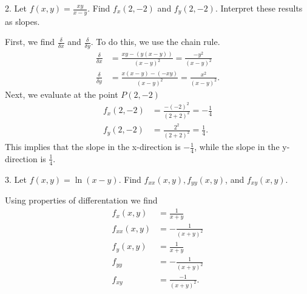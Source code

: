 \documentclass{report}
\begin{document}
    \begin{mdframed}
        2. Let $f(x, y)=\frac{x y}{x-y}$. Find $f_x(2,-2)$ and $f_y(2,-2)$. Interpret these results as slopes.
    \end{mdframed}
    \bigbreak \noindent 
    First, we find $\frac{\delta }{\delta x}$ and $\frac{\delta }{\delta y}$. To do this, we use the chain rule.
    \begin{align*}
        \frac{\delta }{\delta x} &=  \frac{xy - (y(x-y))}{(x-y)^{2}} = \frac{-y^{2}}{(x-y)^{2}} \\
        \frac{\delta }{\delta y}&= \frac{x(x-y)-(-xy)}{(x-y)^{2}} = \frac{x^{2}}{(x-y)^{2}}
    .\end{align*}
    \bigbreak \noindent 
    Next, we evaluate at the point $P(2,-2)$
    \begin{align*}
        f_{x}(2,-2) &= \frac{-(-2)^{2}}{(2+2)^{2}} = -\frac{1}{4} \\
        f_{y}(2,-2)&=  \frac{2^{2}}{(2+2)^{2}} = \frac{1}{4}
    .\end{align*}
    \bigbreak \noindent 
    This implies that the slope in the x-direction is $-\frac{1}{4}$, while the slope in the y-direction is $\frac{1}{4}$. 

    \bigbreak \noindent 
    \begin{mdframed}
        3. Let $f(x, y)=\ln (x-y)$. Find $f_{x x}(x, y), f_{y y}(x, y)$, and $f_{x y}(x, y)$.
    \end{mdframed}
    \bigbreak \noindent 
    Using properties of differentation we find
    \begin{align*}
        f_{x}(x,y) &= \frac{1}{x+y} \\
        f_{xx}(x,y) &= -\frac{1}{(x+y)^{2}} \\
        f_{y}(x,y) &= \frac{1}{x+y} \\
        f_{yy} &= -\frac{1}{(x + y)^{2}} \\
        f_{xy} &= \frac{-1}{(x + y)^{2}}
  .\end{align*}
\end{document}
